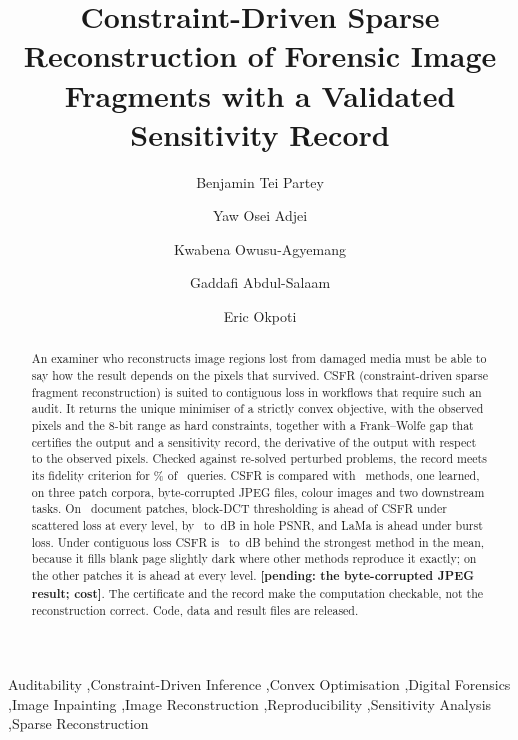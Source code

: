\documentclass[final,3p]{elsarticle}
\newcommand{\resultpending}[1]{\textbf{[pending: #1]}}
\newif\ifanonymous
\begin{document}
\begin{frontmatter}

\title{Constraint-Driven Sparse Reconstruction of Forensic Image Fragments with a Validated Sensitivity Record}

\ifanonymous
  \author{}
  \address{Author and affiliation details removed for double-blind review}
\else
  \author[1]{Benjamin Tei Partey}
  \author[1]{Yaw Osei Adjei}
  \author[1]{Kwabena Owusu-Agyemang}
  \author[1]{Gaddafi Abdul-Salaam}
  \author[1]{Eric Okpoti}
  \address[1]{Department of Computer Science, Kwame Nkrumah University of Science and Technology, Kumasi, Ghana}
\fi

\begin{abstract}
An examiner who reconstructs image regions lost from damaged media must be able to say how the result depends on the pixels that survived. CSFR (constraint-driven sparse fragment reconstruction) is suited to contiguous loss in workflows that require such an audit. It returns the unique minimiser of a strictly convex objective, with the observed pixels and the 8-bit range as hard constraints, together with a Frank--Wolfe gap that certifies the output and a sensitivity record, the derivative of the output with respect to the observed pixels. Checked against re-solved perturbed problems, the record meets its fidelity criterion for \recSrfPooled\% of \recNQueries\ queries. CSFR is compared with \methodsTotal\ methods, one learned, on three patch corpora, byte-corrupted JPEG files, colour images and two downstream tasks. On \corpusGovN\ document patches, block-DCT thresholding is ahead of CSFR under scattered loss at every level, by \qGovCFoneBehindMin\ to \qGovCFoneBehindMax\,dB in hole PSNR, and LaMa is ahead under burst loss. Under contiguous loss CSFR is \qGovCFfourBehindMin\ to \qGovCFthreeBehindMax\,dB behind the strongest method in the mean, because it fills blank page slightly dark where other methods reproduce it exactly; on the other patches it is ahead at every level. \resultpending{the byte-corrupted JPEG result; cost}. The certificate and the record make the computation checkable, not the reconstruction correct. Code, data and result files are released.
\end{abstract}

\begin{keyword}
Auditability \sep Constraint-Driven Inference \sep Convex Optimisation \sep Digital Forensics \sep Image Inpainting \sep Image Reconstruction \sep Reproducibility \sep Sensitivity Analysis \sep Sparse Reconstruction
\end{keyword}

\end{frontmatter}
\end{document}

